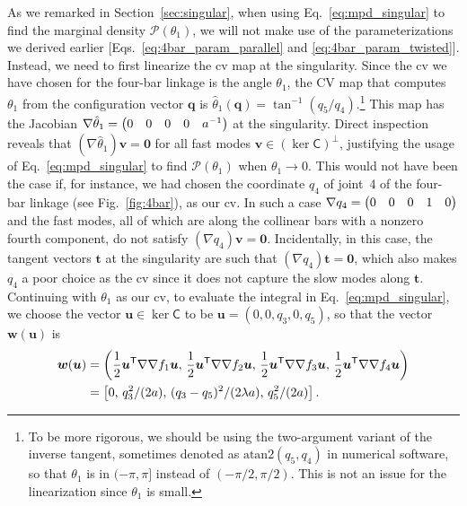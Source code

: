 As we remarked in Section~\ref{sec:singular}, when using Eq.~\eqref{eq:mpd_singular} to find the marginal density $\mathscr{P}(\mathscr{\theta}_{1})$, we will not make use of the parameterizations we derived earlier [Eqs.~\eqref{eq:4bar_param_parallel} and \eqref{eq:4bar_param_twisted}].
Instead, we need to first linearize the \ac{cv} map at the singularity.
Since the \ac{cv} we have chosen for the four-bar linkage is the angle $\theta_{1}$, the CV map that computes $\theta_{1}$ from the configuration vector $\bm{q}$ is $\hat{\theta}_{1}(\bm{q}) = \tan^{-1}(q_{5}/q_{4})$.\footnote{To be more rigorous, we should be using the two-argument variant of the inverse tangent, sometimes denoted as $\mathrm{atan2}(q_{5},q_{4})$ in numerical software, so that $\theta_{1}$ is in $(-\pi, \pi]$ instead of $(-\pi/2,\pi/2)$.  This is not an issue for the linearization since $\theta_{1}$ is small.}
This map has the Jacobian $\nabla\hat{\theta}_1 = \begin{pmatrix}0 & 0 & 0 & 0 & a^{-1}\end{pmatrix}$ at the singularity.
Direct inspection reveals that $(\nabla\hat{\theta}_{1})\bm{v} = \bm{0}$ for all fast modes $\bm{v} \in (\ker\mathsf{C})^{\perp}$, justifying the usage of Eq.~\eqref{eq:mpd_singular} to find $\mathscr{P}(\mathscr{\theta}_{1})$ when $\theta_{1} \to 0$.
This would not have been the case if, for instance, we had chosen the coordinate $q_{4}$ of joint~4 of the four-bar linkage (see Fig.~\ref{fig:4bar}), as our \ac{cv}.
In such a case $\nabla{q_{4}} = \begin{pmatrix}0 & 0 & 0 & 1 & 0\end{pmatrix}$ and the fast modes, all of which are along the collinear bars with a nonzero fourth component, do not satisfy $(\nabla q_{4})\bm{v} = \bm{0}$.
Incidentally, in this case, the tangent vectors $\bm{t}$ at the singularity are such that $(\nabla q_{4})\bm{t} = \bm{0}$, which also makes $q_{4}$ a poor choice as the \ac{cv} since it does not capture the slow modes along $\bm{t}$.
Continuing with $\theta_{1}$ as our \ac{cv}, to evaluate the integral in Eq.~\eqref{eq:mpd_singular}, we choose the vector $\bm{u} \in \ker \mathsf{C}$ to be $\bm{u} = (0, 0, q_3, 0, q_{5})$, so that the vector $\bm{w}(\bm{u})$ is
%
\begin{equation}
  \begin{aligned}
    \bm{w}(\bm{u}) &= \left(\frac{1}{2}\bm{u}^\mathsf{T} \nabla\nabla f_1 \bm{u},\, \frac{1}{2}\bm{u}^\mathsf{T}\nabla\nabla f_2\bm{u},\, \frac{1}{2}\bm{u}^\mathsf{T}\nabla\nabla f_3\bm{u},\, \frac{1}{2}\bm{u}^\mathsf{T}\nabla\nabla f_4\bm{u} \right)\\
      &= \left[0,\,q_3^2/(2a),\,(q_3-q_5)^2/(2\lambda a),\,q_5^2/(2a)\right].
  \end{aligned}
  \label{eq:4bar_w}
\end{equation}
